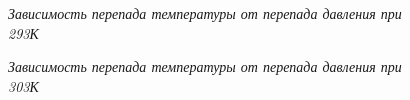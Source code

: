 \documentclass[a4paper, fontsize = 14pt]{article}
\begin{document}
\begin{figure}[hbt]
\caption{\textit{Зависимость перепада температуры от перепада давления при 293К}}
\end{figure}

\begin{figure}[hbt]
\caption{\textit{Зависимость перепада температуры от перепада давления при 303К}}
\end{figure}
\end{document}
